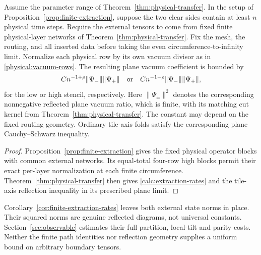 \begin{corollary}
\label{cor:finite-extraction-rates}
Assume the parameter range of Theorem~\ref{thm:physical-transfer}.
In the setup of Proposition~\ref{prop:finite-extraction}, suppose the
two clear sides contain at least $n$ physical time steps.  Require the
external tensors to come from fixed finite physical-layer networks
of Theorem~\ref{thm:physical-transfer}.  Fix the mesh,
the routing, and all inserted data before taking the even
circumference-to-infinity limit.  Normalize each physical row by its
own vacuum divisor as in \eqref{physical:vacuum-rows}.  The resulting
plane vacuum coefficient is bounded by
\begin{equation}
 C n^{-1+\rho}\|\Psi_-\|\|\Psi_+\|
 \quad\hbox{or}\quad
 C n^{-1-\rho}\|\Psi_-\|\|\Psi_+\|,
 \label{calc:extraction-rates}
\end{equation}
for the low or high stencil, respectively.  Here
$\|\Psi_\pm\|^2$ denotes the corresponding nonnegative reflected
plane vacuum ratio, which is finite, with its matching cut kernel from
Theorem~\ref{thm:physical-transfer}.  The constant may depend on the
fixed routing geometry.  Ordinary tile-axis folds satisfy the
corresponding plane Cauchy--Schwarz inequality.
\end{corollary}

\begin{proof}
Proposition~\ref{prop:finite-extraction} gives the fixed physical
operator blocks with common external networks.  Its equal-total
four-row high blocks permit their exact per-layer normalization at
each finite circumference.  Theorem~\ref{thm:physical-transfer}
then gives \eqref{calc:extraction-rates} and the tile-axis reflection
inequality in its prescribed plane limit.
\end{proof}

\begin{remark}
\label{calc:external-norms}
Corollary~\ref{cor:finite-extraction-rates} leaves both external state
norms in place.  Their squared norms are genuine reflected diagrams,
not universal constants.  Section~\ref{sec:observable} estimates
their full partition, local-tilt and parity costs.  Neither the finite
path identities nor reflection geometry supplies a uniform bound on
arbitrary boundary tensors.
\end{remark}


